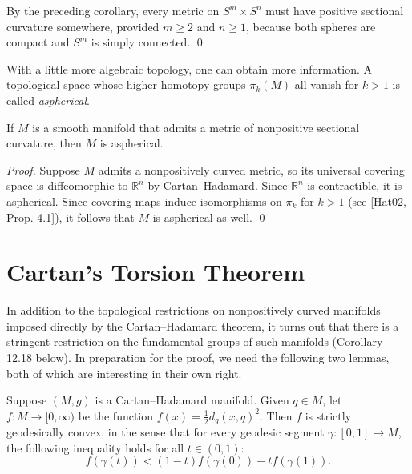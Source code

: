 \begin{example}
\label{ex:positive-curvature-on-product-spheres}

By the preceding corollary, every metric on $S^m \times S^n$ must have positive sectional curvature somewhere, provided $m \geq 2$ and $n \geq 1$, because both spheres are compact and $S^m$ is simply connected. \qed
\end{example}

With a little more algebraic topology, one can obtain more information. A topological space whose higher homotopy groups $\pi_k(M)$ all vanish for $k > 1$ is called \emph{aspherical}.

\begin{corollary}
\label{cor:nonpositive-implies-aspherical}

If $M$ is a smooth manifold that admits a metric of nonpositive sectional curvature, then $M$ is aspherical.
\end{corollary}

\begin{proof}
Suppose $M$ admits a nonpositively curved metric, so its universal covering space is diffeomorphic to $\mathbb{R}^n$ by Cartan--Hadamard. Since $\mathbb{R}^n$ is contractible, it is aspherical. Since covering maps induce isomorphisms on $\pi_k$ for $k > 1$ (see [Hat02, Prop. 4.1]), it follows that $M$ is aspherical as well. \qed
\end{proof}

\section*{Cartan's Torsion Theorem}

In addition to the topological restrictions on nonpositively curved manifolds imposed directly by the Cartan--Hadamard theorem, it turns out that there is a stringent restriction on the fundamental groups of such manifolds (Corollary 12.18 below). In preparation for the proof, we need the following two lemmas, both of which are interesting in their own right.

\begin{lemma}
\label{lem:geodesic-convexity-distance-squared}

Suppose $(M,g)$ is a Cartan--Hadamard manifold. Given $q \in M$, let $f : M \to [0,\infty)$ be the function $f(x) = \frac{1}{2}d_g(x,q)^2$. Then $f$ is strictly geodesically convex, in the sense that for every geodesic segment $\gamma : [0,1] \to M$, the following inequality holds for all $t \in (0,1)$:
\begin{equation}
f(\gamma(t)) < (1-t)f(\gamma(0)) + tf(\gamma(1)). \tag{12.1}
\end{equation}
\end{lemma}

